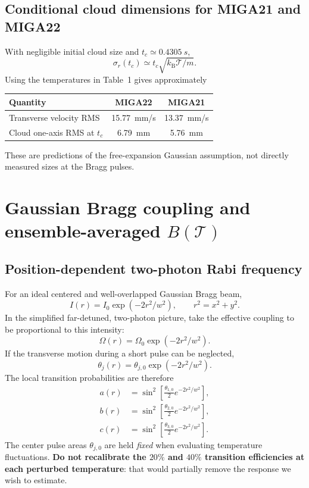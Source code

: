 \documentclass[11pt,a4paper]{article}
\numberwithin{equation}{section}
\newcommand{\Tat}{\mathcal{T}}
\newcommand{\kb}{k_{\mathrm B}}
\begin{document}
\subsection{Conditional cloud dimensions for MIGA21 and MIGA22}

With negligible initial cloud size and $t_c\simeq\SI{0.4305}{s}$,
\begin{equation}
\sigma_r(t_c)\simeq t_c\sqrt{\kb\Tat/m}.
\end{equation}
Using the temperatures in Table~1 gives approximately
\begin{center}
\begin{tabular}{lcc}\toprule
Quantity & MIGA22 & MIGA21\\\midrule
Transverse velocity RMS & \SI{15.77}{mm/s} & \SI{13.37}{mm/s}\\
Cloud one-axis RMS at $t_c$ & \SI{6.79}{mm} & \SI{5.76}{mm}\\\bottomrule
\end{tabular}
\end{center}
These are predictions of the free-expansion Gaussian assumption, not directly
measured sizes at the Bragg pulses.

\section{Gaussian Bragg coupling and ensemble-averaged $B(\Tat)$}

\subsection{Position-dependent two-photon Rabi frequency}

For an ideal centered and well-overlapped Gaussian Bragg beam,
\begin{equation}\label{eq:gaussianI}
I(r)=I_0\exp(-2r^2/w^2),\qquad r^2=x^2+y^2.
\end{equation}
In the simplified far-detuned, two-photon picture, take the effective
coupling to be proportional to this intensity:
\begin{equation}\label{eq:gaussianOmega}
\Omega(r)=\Omega_0\exp(-2r^2/w^2).
\end{equation}
If the transverse motion during a short pulse can be neglected,
\begin{equation}
\theta_j(r)=\theta_{j,0}\exp(-2r^2/w^2).
\end{equation}
The local transition probabilities are therefore
\begin{align}
a(r)&=\sin^2\left[\frac{\theta_{1,0}}2 e^{-2r^2/w^2}\right],\\
b(r)&=\sin^2\left[\frac{\theta_{2,0}}2 e^{-2r^2/w^2}\right],\\
c(r)&=\sin^2\left[\frac{\theta_{3,0}}2 e^{-2r^2/w^2}\right].
\end{align}
The center pulse areas $\theta_{j,0}$ are held \emph{fixed} when evaluating
temperature fluctuations. \textbf{Do not recalibrate the $20\%$ and $40\%$
transition efficiencies at each perturbed temperature}: that would partially
remove the response we wish to estimate.
\end{document}
